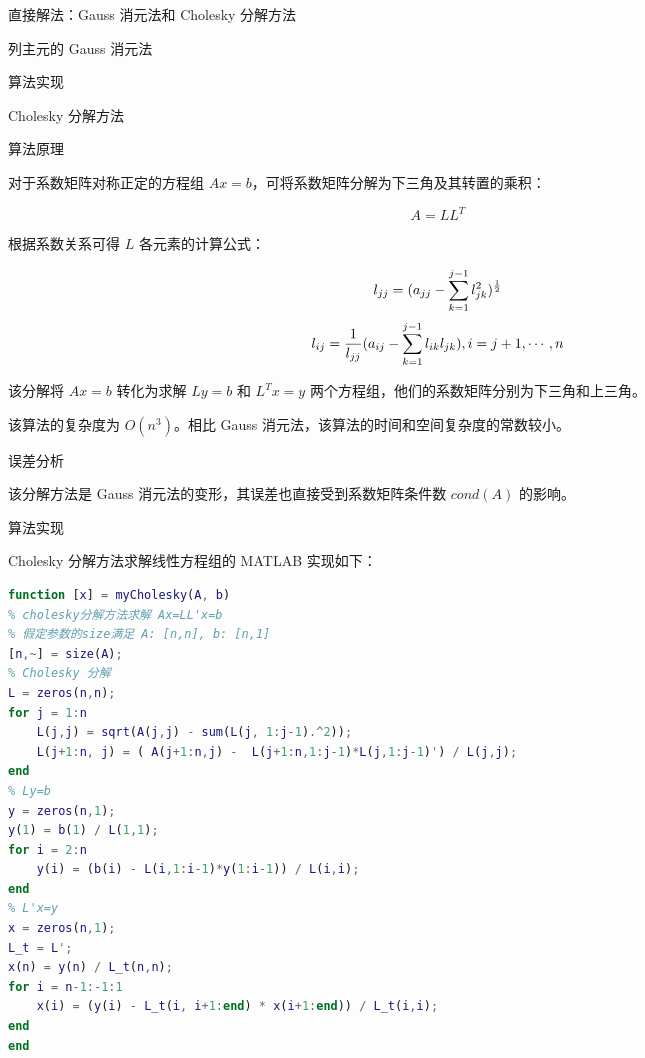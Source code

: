 \documentclass[a4paper]{article}
\begin{document}
\begin{multicols}{2}
\begin{section}{直接解法：Gauss 消元法和 Cholesky 分解方法}
\begin{subsection}{列主元的 Gauss 消元法}
\begin{subsubsection}{算法实现}
		\end{subsubsection}
	
	\end{subsection}
	
	\begin{subsection}{Cholesky 分解方法}
	
		\begin{subsubsection}{算法原理}
		
			对于系数矩阵对称正定的方程组 $Ax=b$，可将系数矩阵分解为下三角及其转置的乘积：
			
			$$A = LL^T$$
			
			根据系数关系可得 $L$ 各元素的计算公式：
			
			$$l_{jj} = (a_{jj}-\sum_{k=1}^{j-1}l_{jk}^2)^{1\over 2}$$
			$$l_{ij} = {1\over l_{jj}} (a_{ij} - \sum_{k=1}^{j-1}l_{ik}l_{jk}), i=j+1,\cdots,n$$
			
			该分解将 $Ax=b$ 转化为求解 $Ly=b$ 和 $L^Tx=y$ 两个方程组，他们的系数矩阵分别为下三角和上三角。
			
			该算法的复杂度为 $O(n^3)$。相比 Gauss 消元法，该算法的时间和空间复杂度的常数较小。
		
		\end{subsubsection}
	
		\begin{subsubsection}{误差分析}
		
			该分解方法是 Gauss 消元法的变形，其误差也直接受到系数矩阵条件数 $cond(A)$ 的影响。
			
		\end{subsubsection}
	
		\begin{subsubsection}{算法实现}
		
			Cholesky 分解方法求解线性方程组的 MATLAB 实现如下：
			
			\begin{lstlisting}[language=Matlab]
function [x] = myCholesky(A, b)
% cholesky分解方法求解 Ax=LL'x=b
% 假定参数的size满足 A: [n,n], b: [n,1]
[n,~] = size(A);
% Cholesky 分解
L = zeros(n,n);
for j = 1:n
    L(j,j) = sqrt(A(j,j) - sum(L(j, 1:j-1).^2));
    L(j+1:n, j) = ( A(j+1:n,j) -  L(j+1:n,1:j-1)*L(j,1:j-1)') / L(j,j); 
end
% Ly=b
y = zeros(n,1);
y(1) = b(1) / L(1,1);
for i = 2:n
    y(i) = (b(i) - L(i,1:i-1)*y(1:i-1)) / L(i,i);
end
% L'x=y
x = zeros(n,1);
L_t = L';
x(n) = y(n) / L_t(n,n);
for i = n-1:-1:1
    x(i) = (y(i) - L_t(i, i+1:end) * x(i+1:end)) / L_t(i,i);
end
end
			\end{lstlisting}
		
		\end{subsubsection}
		

\end{subsection}
\end{section}
\end{multicols}
\end{document}
